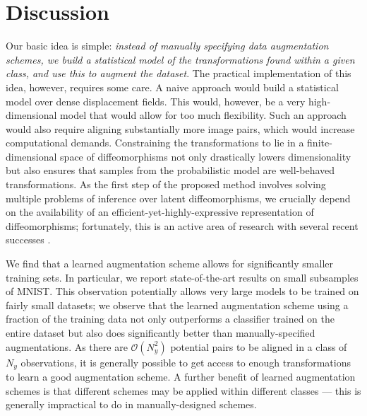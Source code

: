 \documentclass[twoside]{article}
\begin{document}
  \section{Discussion}\label{sec:discussion}
  Our basic idea is simple: \emph{instead of manually specifying data augmentation
  schemes, we build a statistical model of the transformations found within a
  given class, and use this to augment the dataset}. The practical implementation
  of this idea, however, requires some care. A naive approach would build a statistical model 
  over dense displacement fields. This would, however,
  be a very high-dimensional model that would allow for too much flexibility.
  Such an approach would also require aligning substantially more image pairs,
  which would increase computational demands.
  Constraining the transformations to lie in a finite-dimensional space of diffeomorphisms 
  not only drastically lowers dimensionality but also ensures that samples from the probabilistic
  model are well-behaved transformations. 
  As the first step of the proposed method involves solving multiple problems of inference over latent diffeomorphisms,
  we crucially depend on the availability of an efficient-yet-highly-expressive representation of diffeomorphisms;
  fortunately, this is an active area of research with several recent successes
  \cite{freifeld2015transform, zhang:ipmi:2015, Arsigny:BIR:2006}.
  
  We find that a learned augmentation scheme allows for significantly smaller
  training sets. In particular, we report state-of-the-art results on small
  subsamples of MNIST. This observation potentially allows very large models to be
  trained on fairly small datasets; we observe that the learned augmentation
  scheme using a fraction of the training data not only outperforms a classifier
  trained on the entire dataset but also does significantly better than manually-specified augmentations.
  As there are $\mathcal{O}(N_y^2)$ potential pairs to be aligned in a class of $N_y$
  observations, it is generally possible to get access to enough transformations
  to learn a good augmentation scheme.
  A further benefit of learned augmentation schemes is that different schemes
  may be applied within different classes --- this is generally impractical
  to do in manually-designed schemes. 
  
\end{document}
